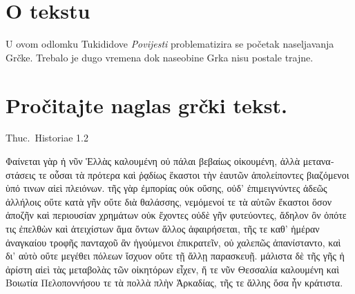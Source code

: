 

\section*{O tekstu}

U ovom odlomku Tukididove \textit{Povijesti} problematizira se početak naseljavanja Grčke. Trebalo je dugo vremena dok naseobine Grka nisu postale trajne.


\section*{Pročitajte naglas grčki tekst.}

Thuc.\ Historiae 1.2


\medskip

\begin{greek}
{\large
{ \noindent Φαίνεται γὰρ ἡ νῦν Ἑλλὰς καλουμένη οὐ πάλαι βεβαίως οἰκουμένη, ἀλλὰ μεταναστάσεις τε οὖσαι τὰ πρότερα καὶ ῥᾳδίως ἕκαστοι τὴν ἑαυτῶν ἀπολείποντες βιαζόμενοι ὑπό τινων αἰεὶ πλειόνων. τῆς γὰρ ἐμπορίας οὐκ οὔσης, οὐδ’ ἐπιμειγνύντες ἀδεῶς ἀλλήλοις οὔτε κατὰ γῆν οὔτε διὰ θαλάσσης, νεμόμενοί τε τὰ αὑτῶν ἕκαστοι ὅσον ἀποζῆν καὶ περιουσίαν χρημάτων οὐκ ἔχοντες οὐδὲ γῆν φυτεύοντες, ἄδηλον ὂν ὁπότε τις ἐπελθὼν καὶ ἀτειχίστων ἅμα ὄντων ἄλλος ἀφαιρήσεται, τῆς τε καθ’ ἡμέραν ἀναγκαίου τροφῆς πανταχοῦ ἂν ἡγούμενοι ἐπικρατεῖν, οὐ χαλεπῶς ἀπανίσταντο, καὶ δι’ αὐτὸ οὔτε μεγέθει πόλεων ἴσχυον οὔτε τῇ ἄλλῃ παρασκευῇ. μάλιστα δὲ τῆς γῆς ἡ ἀρίστη αἰεὶ τὰς μεταβολὰς τῶν οἰκητόρων εἶχεν, ἥ τε νῦν Θεσσαλία καλουμένη καὶ Βοιωτία Πελοποννήσου τε τὰ πολλὰ πλὴν Ἀρκαδίας, τῆς τε ἄλλης ὅσα ἦν κράτιστα.

}
}
\end{greek}
